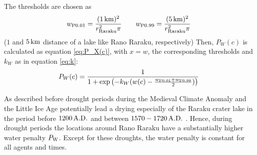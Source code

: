 The thresholds are chosen as 
\begin{equation}
w_{\rm P0.01} = \frac{(1\, {\rm km})^2}{r_\text{Raraku}^2\pi} \qquad
 w_{\rm P0.99}=\frac{(5\, {\rm km})^2}{r_\text{Raraku}^2\pi}
\end{equation} 
($1$ and $5\, {\rm km}$ distance of a lake like Rano Raraku, respectively)
Then, $P_W(c)$ is calculated as equation \ref{eq:P_X(c)}, with $x=w$, the corresponding thresholds and $k_W$ as in equation \ref{eq:k}:
\begin{equation}
	P_W(c) = \frac{1}{1+\exp\left( - k_W (w(c)-\frac{w_{\rm P0.01}+w_{\rm P0.99}}{2}) \right)}
\end{equation}

As described before drought periods during the Medieval Climate Anomaly and the Little Ice Age potentially lead a drying especially of the Raraku crater lake in the period before $1200\, {\rm A.D.}$ and between $1570-1720 \, {\rm A.D.}$ \citep{Rull2020}. 
Hence, during drought periods the locations around Rano Raraku have a substantially higher water penalty $P_{\rm W}$.
Except for these droughts, the water penalty is constant for all agents and times.


